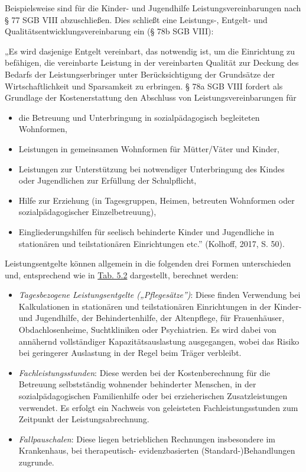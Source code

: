 \documentclass[
  letterpaper,
]{book}
\begin{document}
Beispielsweise sind für die Kinder- und Jugendhilfe
Leistungsvereinbarungen nach § 77 SGB VIII abzuschließen. Dies schließt
eine Leistungs-, Entgelt- und Qualitätsentwicklungsvereinbarung ein (§
78b SGB VIII):

„Es wird dasjenige Entgelt vereinbart, das notwendig ist, um die
Einrichtung zu befähigen, die vereinbarte Leistung in der vereinbarten
Qualität zur Deckung des Bedarfs der Leistungserbringer unter
Berücksichtigung der Grundsätze der Wirtschaftlichkeit und Sparsamkeit
zu erbringen. § 78a SGB VIII fordert als Grundlage der Kostenerstattung
den Abschluss von Leistungsvereinbarungen für

\begin{itemize}
\item
  die Betreuung und Unterbringung in sozialpädagogisch begleiteten
  Wohnformen,
\item
  Leistungen in gemeinsamen Wohnformen für Mütter/Väter und Kinder,
\item
  Leistungen zur Unterstützung bei notwendiger Unterbringung des Kindes
  oder Jugendlichen zur Erfüllung der Schulpflicht,
\item
  Hilfe zur Erziehung (in Tagesgruppen, Heimen, betreuten Wohnformen
  oder sozialpädagogischer Einzelbetreuung),
\item
  Eingliederungshilfen für seelisch behinderte Kinder und Jugendliche in
  stationären und teilstationären Einrichtungen etc.'' (Kolhoff, 2017,
  S. 50).
\end{itemize}

Leistungsentgelte können allgemein in die folgenden drei Formen
unterschieden und, entsprechend wie in \hyperref[table52]{Tab. 5.2}
dargestellt, berechnet werden:

\begin{itemize}
\item
  \emph{Tagesbezogene Leistungsentgelte („Pflegesätze'')}: Diese finden
  Verwendung bei Kalkulationen in stationären und teilstationären
  Einrichtungen in der Kinder- und Jugendhilfe, der Behindertenhilfe,
  der Altenpflege, für Frauenhäuser, Obdachlosenheime, Suchtkliniken
  oder Psychiatrien. Es wird dabei von annähernd vollständiger
  Kapazitätsauslastung ausgegangen, wobei das Risiko bei geringerer
  Auslastung in der Regel beim Träger verbleibt.
\item
  \emph{Fachleistungsstunden}: Diese werden bei der Kostenberechnung für
  die Betreuung selbstständig wohnender behinderter Menschen, in der
  sozialpädagogischen Familienhilfe oder bei erzieherischen
  Zusatzleistungen verwendet. Es erfolgt ein Nachweis von geleisteten
  Fachleistungsstunden zum Zeitpunkt der Leistungsabrechnung.
\item
  \emph{Fallpauschalen}: Diese liegen betrieblichen Rechnungen
  insbesondere im Krankenhaus, bei therapeutisch- evidenzbasierten
  (Standard-)Behandlungen zugrunde.
\end{itemize}
\end{document}
